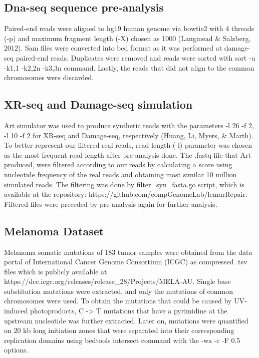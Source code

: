 \subsection{Dna-seq sequence pre-analysis}
Paired-end reads were aligned to hg19 human genome via bowtie2 with 4 threads (-p) and maximum fragment length (-X) chosen as 1000 (Langmead \& Salzberg, 2012). Sam files were converted into bed format as it was performed at damage-seq paired-end reads. Duplicates were removed and reads were sorted with sort -u -k1,1 -k2,2n -k3,3n command. Lastly, the reads that did not align to the common chromosomes were discarded.

\subsection{XR-seq and Damage-seq simulation}
Art simulator was used to produce synthetic reads with the parameters
-l 26 -f 2, -l 10 -f 2 for XR-seq and Damage-seq, respectively (Huang, Li, Myers, \& Marth). To better represent our filtered real reads, read length (-l) parameter was chosen as the most frequent read length after pre-analysis done. The .fastq file that Art produced, were filtered according to our reads by calculating a score using nucleotide frequency of the real reads and obtaining most similar 10 million simulated reads. 
The filtering was done by filter\_syn\_fasta.go script, which is available at the repository: https://github.com/compGenomeLab/lemurRepair. 
Filtered files were preceded by pre-analysis again for further analysis.

\subsection{Melanoma Dataset}
Melanoma somatic mutations of 183 tumor samples were obtained from the data portal of International Cancer Genome Consortium (ICGC) as compressed .tsv files which is publicly available at https://dcc.icgc.org/releases/release\_28/Projects/MELA-AU. Single base substitution mutations were extracted, and only the mutations of common chromosomes were used. To obtain the mutations that could be caused by UV-induced photoproducts, C -> T mutations that have a pyrimidine at the upstream nucleotide was further extracted. Later on, mutations were quantified on 20 kb long initiation zones that were separated into their corresponding replication domains using bedtools intersect command with the -wa -c -F 0.5 options.


